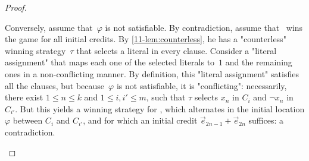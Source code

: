 \begin{proof}
\begin{scope}
    Conversely, assume that~$\varphi$ is not satisfiable.  By
    contradiction, assume that \Adam\ wins the game for all initial
    credits.  By \cref{11-lem:counterless}, he has a "counterless" winning
    strategy~$\tau$ that selects a literal in every clause.  Consider
    a "literal assignment" that maps each one of the selected literals
    to~$1$ and the remaining ones in a non-conflicting manner.  By
    definition, this "literal assignment" satisfies all the clauses,
    but because~$\varphi$ is not satisfiable, it is "conflicting":
    necessarily, there exist $1\leq n\leq k$ and $1\leq i,i'\leq m$,
    such that $\tau$ selects $x_n$ in $C_i$ and $\neg x_n$ in
    $C_{i'}$.  But this yields a winning strategy for \Eve, which
    alternates in the initial location $\varphi$ between $C_{i}$
    and $C_{i'}$, and for which an initial credit
    $\vec e_{2n-1}+\vec e_{2n}$ suffices: a contradiction.
  \end{scope}

\end{proof}

